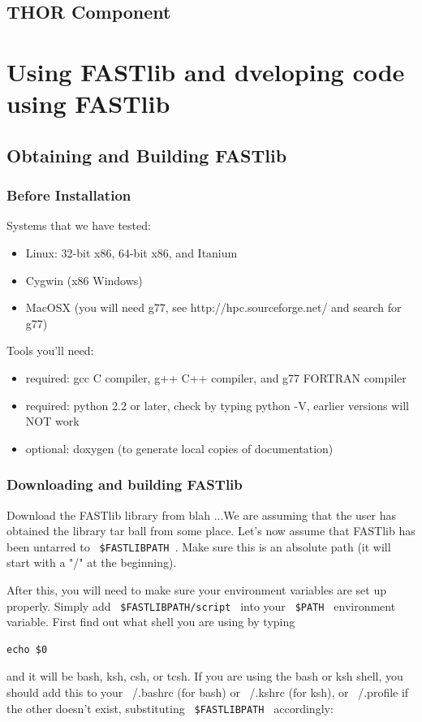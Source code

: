 \documentclass[letter]{report}
\begin{document}
\section {THOR Component}

\chapter {Using FASTlib and dveloping code using FASTlib}
\section{Obtaining and Building FASTlib}
\subsection {Before Installation}
Systems that we have tested:
\begin{itemize}
\item Linux: 32-bit x86, 64-bit x86, and Itanium
\item Cygwin (x86 Windows)
\item MacOSX (you will need g77, see http://hpc.sourceforge.net/ and search for g77)
\end {itemize} 
Tools you'll need:
\begin {itemize}
\item required: gcc C compiler, g++ C++ compiler, and g77 FORTRAN compiler
\item required: python 2.2 or later, check by typing python -V, earlier versions will NOT work
\item optional: doxygen (to generate local copies of documentation) 
\end {itemize}

\subsection{Downloading and building FASTlib}
Download the FASTlib library from blah ...We are assuming that the user has obtained the library tar ball from some place. Let's now assume that FASTlib has been untarred to \verb= $FASTLIBPATH =. Make sure this is an absolute path (it will start with a "/" at the beginning).

After this, you will need to make sure your environment variables are set up properly. Simply add \verb= $FASTLIBPATH/script = into your \verb= $PATH = environment variable. First find out what shell you are using by typing

\begin{verbatim}
echo $0
\end{verbatim}
and it will be bash, ksh, csh, or tcsh. If you are using the bash or ksh shell, you should add this to your ~/.bashrc (for bash) or ~/.kshrc (for ksh), or ~/.profile if the other doesn't exist, substituting \verb= $FASTLIBPATH = accordingly:
\end{document}

